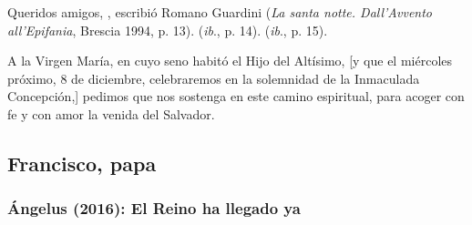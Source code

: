 \begin{body}
				Queridos amigos, , escribió Romano Guardini (\emph{La santa notte. Dall'Avvento all'Epifania}, Brescia 1994, p. 13).  (\emph{ib}., p. 14).  (\emph{ib}., p. 15).
				
				A la Virgen María, en cuyo seno habitó el Hijo del Altísimo, {[}y que el miércoles próximo, 8 de diciembre, celebraremos en la solemnidad de la Inmaculada Concepción,{]} pedimos que nos sostenga en este camino espiritual, para acoger con fe y con amor la venida del Salvador.
			\end{body}

\newsection
		
	\subsection{Francisco, papa}
	
		\subsubsection{Ángelus (2016): El Reino ha llegado ya}
			
			
